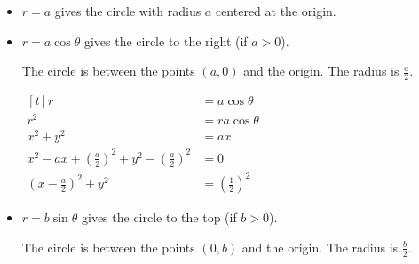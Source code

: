 \begin{itemize}
    \item $r = a$ gives the circle with radius $a$ centered at the origin.

    \begin{center}
    \end{center}

    \item $r = a\cos{\theta}$ gives the circle to the right (if $a > 0$).
    
    The circle is between the points $(a, 0)$ and the origin. The radius is $\frac{a}{2}$.

    $\begin{aligned}[t]
        r                                                                        & = a \cos{\theta}             \\
        r^2                                                                      & = r a \cos{\theta}           \\
        x^2 + y^2                                                                & = ax                         \\
        x^2 - ax + \left(\frac{a}{2}\right)^2 + y^2 - \left(\frac{a}{2}\right)^2 & = 0                          \\
        \left(x - \frac{a}{2}\right)^2 + y^2                                     & = \left(\frac{1}{2}\right)^2
    \end{aligned}$

    \item $r = b\sin{\theta}$ gives the circle to the top (if $b > 0$).

    The circle is between the points $(0, b)$ and the origin. The radius is $\frac{b}{2}$.
\end{itemize}

\begin{example}
    
\end{example}
